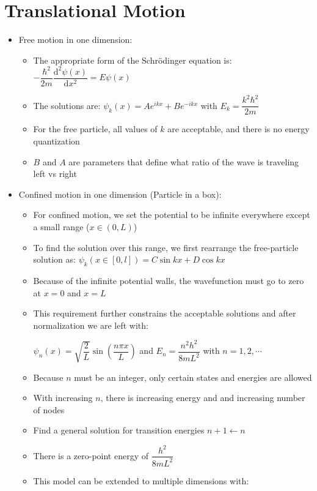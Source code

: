 \documentclass[12pt, openany, letterpaper]{memoir}
\begin{document}
\section{Translational Motion}
\begin{itemize}
	\item Free motion in one dimension:
	\begin{itemize}
		\item The appropriate form of the Schr\"odinger equation is: $-\dfrac{\hbar^2}{2m}\dfrac{\mathrm{d}^2\psi(x)}{\mathrm{d}x^2}=E\psi(x)$
		\item The solutions are: $\psi_k(x)=Ae^{ikx}+Be^{-ikx}$ with $E_k = \dfrac{k^2\hbar^2}{2m}$
		\item For the free particle, all values of $k$ are acceptable, and there is no energy quantization
		\item $B$ and $A$ are parameters that define what ratio of the wave is traveling left vs right
	\end{itemize}
	\item Confined motion in one dimension (Particle in a box):
	\begin{itemize}
		\item For confined motion, we set the potential to be infinite everywhere except a small range ($x\in (0,L)$)
		\item To find the solution over this range, we first rearrange the free-particle solution as: $\psi_k\left(x\in [0,l]\right) = C\sin kx + D\cos kx$
		\item Because of the infinite potential walls, the wavefunction must go to zero at $x=0$ and $x=L$
		\item This requirement further constrains the acceptable solutions and after normalization we are left with:
		
		 $\psi_n(x) = \sqrt{\dfrac{2}{L}}\sin\left(\dfrac{n\pi x}{L}\right)$ and $E_n = \dfrac{n^2h^2}{8mL^2}$ with $n=1,2,\cdots$
		 \item Because $n$ must be an integer, only certain states and energies are allowed
		 \item With increasing $n$, there is increasing energy and and increasing number of nodes
		 \item Find a general solution for transition energies $n+1\leftarrow n$
		 \item There is a zero-point energy of $\dfrac{h^2}{8mL^2}$
		 \item This model can be extended to multiple dimensions with:
		 

\end{itemize}
\end{itemize}
\end{document}
